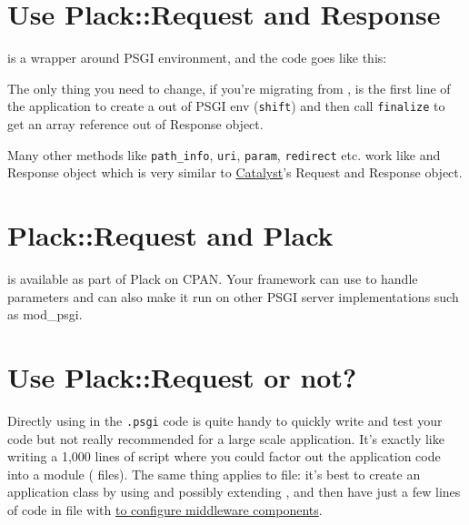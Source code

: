 \section{Use Plack::Request and
Response}\label{use-plackrequest-and-response}

 is a wrapper around PSGI environment, and the code goes
like this:


The only thing you need to change, if you're migrating from
, is the first line of the application to create a
 out of PSGI env (\lstinline!shift!) and then call
\lstinline!finalize! to get an array reference out of Response object.

Many other methods like \lstinline!path_info!, \lstinline!uri!,
\lstinline!param!, \lstinline!redirect! etc. work like
 and Response object which is very similar to
\href{http://search.cpan.org/dist/Catalyst-Runtime}{Catalyst}'s Request
and Response object.

\section{Plack::Request and Plack}\label{plackrequest-and-plack}

 is available as part of Plack on CPAN. Your framework can
use  to handle parameters and can also make it run on
other PSGI server implementations such as mod\_psgi.

\section{Use Plack::Request or not?}\label{use-plackrequest-or-not}

Directly using  in the \lstinline!.psgi! code is quite
handy to quickly write and test your code but not really recommended for
a large scale application. It's exactly like writing a 1{,}000 lines of
 script where you could factor out the application code
into a module ( files). The same thing applies to
 file: it's best to create an application class by
using and possibly extending , and then have just a few
lines of code in  file with
\href{http://advent.plackperl.org/2009/12/day-11-using-plackbuilder.html}{
to configure middleware components}.

